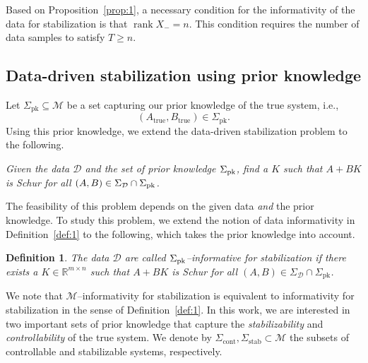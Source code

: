 \documentclass[9pt,shortpaper,twoside,web]{ieeecolor}
\DeclareMathOperator{\rank}{rank}
\newcommand{\set}[2]{\left\{#1 \mid #2\right\}}
\newtheorem{definition}[theorem]{Definition}
\begin{document}
Based on Proposition~\ref{prop:1}, a necessary condition for the informativity of the data for stabilization is that $\rank X_-=n$. This condition requires the number of data samples to satisfy $T\geq n$.

\subsection{Data-driven stabilization using prior knowledge}

Let $\Sigma_\text{pk}\subseteq\mathcal{M}$ be a set capturing our prior knowledge of the true system, i.e.,
\begin{equation}
(A_\text{true},B_\text{true})\in\Sigma_\text{pk}.
\end{equation}
Using this prior knowledge, we extend the data-driven stabilization problem to the following.

\begin{center}
\textit{Given the data $\mathcal{D}$ and the set of prior knowledge $\Sigma_\textup{pk}$, find a $K$ such that $A+BK$ is Schur for all $(A,B)\in\Sigma_\mathcal{D}\cap\Sigma_\textup{pk}$.}
\end{center}

The feasibility of this problem depends on the given data \emph{and} the prior knowledge. To study this problem, we extend the notion of data informativity in Definition~\ref{def:1} to the following, which takes the prior knowledge into account. 

\begin{definition}
\label{def:2}
The data $\mathcal{D}$ are called $\Sigma_\textup{pk}$--\emph{informative for stabilization} if there exists a $K\in\mathbb{R}^{m\times n}$ such that $A+BK$ is Schur for all $(A,B)\in\Sigma_\mathcal{D}\cap\Sigma_\text{pk}$. 
\end{definition}

We note that $\mathcal{M}$--informativity for stabilization is equivalent to informativity for stabilization in the sense of Definition~\ref{def:1}.  In this work, we are interested in two important sets of prior knowledge that capture the \emph{stabilizability} and \emph{controllability} of the true system. We denote by $\Sigma_\text{cont}, \Sigma_\text{stab} \subset \mathcal{M}$ the subsets of controllable and stabilizable systems, respectively.
\end{document}
